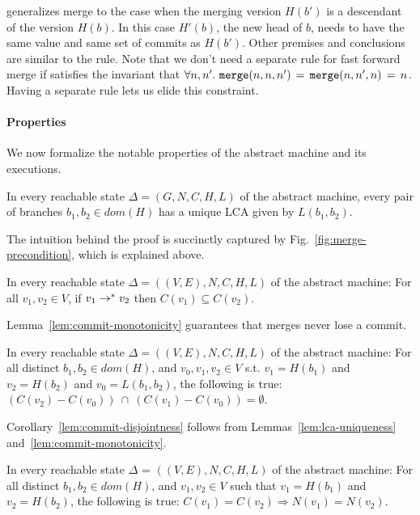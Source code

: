  generalizes merge to the case when the merging
version $H(b')$ is a descendant of the version $H(b)$. In this case
$H'(b)$, the new head of $b$, needs to have the same value and same
set of commits as $H(b')$. Other premises and conclusions are similar
to the  rule. Note that we don't need a separate rule
for fast forward merge if  satisfies the invariant that
$\forall n, n'.~ {\tt merge}(n,n,n') \,=\, {\tt merge}(n,n',n) \,=\, n$.
Having a separate rule lets us elide this constraint.

\paragraph{Properties} We now formalize the notable properties of the
abstract machine and its executions.

\begin{lemma}
  \label{lem:lca-uniqueness}
  In every reachable state $\Delta = (G,N,C,H,L)$ of the abstract
  machine, every pair of branches $b_1, b_2 \in dom(H)$ has a unique
  LCA given by $L(b_1,b_2)$.
\end{lemma}

The intuition behind the proof is succinctly captured by
Fig.~\ref{fig:merge-precondition}, which is explained above.

\begin{lemma}
  \label{lem:commit-monotonicity}
  In every reachable state $\Delta = ((V,E),N,C,H,L)$ of the abstract
  machine: For all $v_1,v_2 \in V$, if $v_1 \rightarrow^{*} v_2$ then $C(v_1)
  \subseteq C(v_2)$.
\end{lemma}

Lemma~\ref{lem:commit-monotonicity} guarantees that merges never lose
a commit.

\begin{corollary}
  \label{lem:commit-disjointness}
  In every reachable state $\Delta = ((V,E),N,C,H,L)$ of the abstract
  machine: For all distinct $b_1, b_2 \in dom(H)$, and $v_0, v_1, v_2
  \in V$ s.t.  $v_1 = H(b_1)$ and $v_2 = H(b_2)$ and $v_0 =
  L(b_1,b_2)$, the following is true: $(C(v_2) - C(v_0)) ~\cap~
  (C(v_1) - C(v_0)) = \emptyset$.
\end{corollary}

Corollary~\ref{lem:commit-disjointness} follows from
Lemmas~\ref{lem:lca-uniqueness} and~\ref{lem:commit-monotonicity}.

\begin{theorem}[{\bf Convergence}]
  \label{thm:convergence}
  In every reachable state $\Delta$ = $((V,E),N,C,H,L)$ of the abstract
  machine: For all distinct $b_1, b_2 \in dom(H)$, and $v_1, v_2 \in V$
  such that $v_1 = H(b_1)$ and $v_2 = H(b_2)$, the following is true:
  $C(v_1) = C(v_2) \Rightarrow N(v_1) = N(v_2)$.
\end{theorem}

